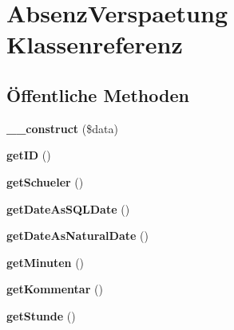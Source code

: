 \hypertarget{class_absenz_verspaetung}{}\section{Absenz\+Verspaetung Klassenreferenz}
\label{class_absenz_verspaetung}
\subsection*{Öffentliche Methoden}
\begin{DoxyCompactItemize}
\item 
\mbox{\label{class_absenz_verspaetung_aa6b27e38d951d26ebd827c4a837b93e6}} 
{\bfseries \+\_\+\+\_\+construct} (\$data)
\item 
\mbox{\label{class_absenz_verspaetung_a32738aebffd05860b289240517cd10ac}} 
{\bfseries get\+ID} ()
\item 
\mbox{\label{class_absenz_verspaetung_aaa76a96128f4e0e7109573ea70b1123a}} 
{\bfseries get\+Schueler} ()
\item 
\mbox{\label{class_absenz_verspaetung_a8c777bfe073a8ede64ed837e59748216}} 
{\bfseries get\+Date\+As\+S\+Q\+L\+Date} ()
\item 
\mbox{\label{class_absenz_verspaetung_a65f9e2da03d2cf3697ba0ed9e684d943}} 
{\bfseries get\+Date\+As\+Natural\+Date} ()
\item 
\mbox{\label{class_absenz_verspaetung_a7ca164ade7655a96a06d802b4c19e424}} 
{\bfseries get\+Minuten} ()
\item 
\mbox{\label{class_absenz_verspaetung_a9c18e9ef0cea4d297fd48095d3291612}} 
{\bfseries get\+Kommentar} ()
\item 
\mbox{\label{class_absenz_verspaetung_af92d16f04f7459f24468ac0f2078bb70}} 
{\bfseries get\+Stunde} ()
\item 
\mbox{\label{class_absenz_verspaetung_adceb67d74c4e0afe83685ed93ce41bfc}} 

\end{DoxyCompactItemize}
